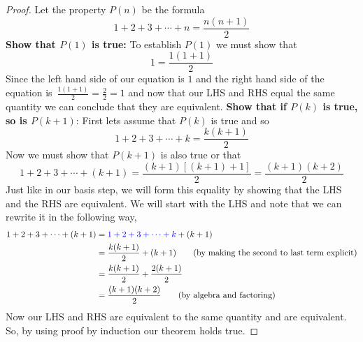 \documentclass[addpoints]{exam}
\begin{document}
    \begin{proof}
      Let the property $P(n)$ be the formula
      \[
        1 + 2 + 3 + \cdots + n = \frac{n(n+1)}{2}
      \]
      \newline\textbf{Show that $P(1)$ is true:} To establish $P(1)$ we must show that 
      \[
        1 = \frac{1(1+1)}{2}
      \]
      Since the left hand side of our equation is $1$ and the right hand side of the equation is $\displaystyle\,\frac{1(1+1)}{2}=\frac{2}{2} = 1$ and now that our LHS and RHS equal the same quantity we can conclude that they are equivalent.
      \newline\textbf{Show that if $P(k)$ is true, so is $P(k+1)$}: First lets assume that $P(k)$ is true and so 
      \[
      1 + 2 + 3 + \cdots + k = \frac{k(k+1)}{2}
      \]
      Now we must show that $P(k+1)$ is also true or that
      \[
        1 + 2 + 3 + \cdots + (k+1) = \frac{\left(k+1\right)\left[\left(k+1\right)+1\right]}{2} = \frac{\left(k+1\right)\left(k+2\right)}{2}
      \]
      Just like in our basis step, we will form this equality by showing that the LHS and the RHS are equivalent. We will start with the LHS and note that we can rewrite it in the following way,
      \begin{align*}
        1 + 2 + 3 + \cdots + (k+1) &= \textcolor{blue}{1 + 2 + 3 + \cdots + k} + (k + 1) \\ 
        &= \frac{k(k+1)}{2} + (k+1) \tag{by making the second to last term explicit} \\ 
        &= \frac{k(k+1)}{2} + \frac{2(k+1)}{2} \\ 
        &= \frac{(k+1)(k+2)}{2} \tag{by algebra and factoring}
      \end{align*}
      Now our LHS and RHS are equivalent to the same quantity and are equivalent. So, by using proof by induction our theorem holds true.
    \end{proof}
          \else
\end{document}
